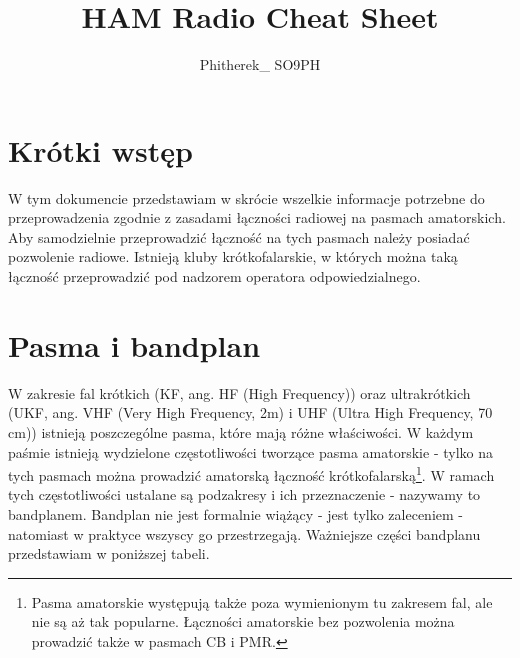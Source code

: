 \documentclass[a4paper,11pt]{article}
\author{Phitherek\_ SO9PH}
\title{HAM Radio Cheat Sheet}
\begin{document}
\maketitle
\tableofcontents
\section{Krótki wstęp}
W tym dokumencie przedstawiam w skrócie wszelkie informacje potrzebne do przeprowadzenia zgodnie z zasadami łączności radiowej na pasmach amatorskich. Aby samodzielnie przeprowadzić łączność na tych pasmach należy posiadać pozwolenie radiowe. Istnieją kluby krótkofalarskie, w których można taką łączność przeprowadzić pod nadzorem operatora odpowiedzialnego.
\section{Pasma i bandplan}
W zakresie fal krótkich (KF, ang. HF (High Frequency)) oraz ultrakrótkich (UKF, ang. VHF (Very High Frequency, 2m) i UHF (Ultra High Frequency, 70 cm)) istnieją poszczególne pasma, które mają różne właściwości. W każdym paśmie istnieją wydzielone częstotliwości tworzące pasma amatorskie - tylko na tych pasmach można prowadzić amatorską łączność krótkofalarską\footnote{Pasma amatorskie występują także poza wymienionym tu zakresem fal, ale nie są aż tak popularne. Łączności amatorskie bez pozwolenia można prowadzić także w pasmach CB i PMR.}. W ramach tych częstotliwości ustalane są podzakresy i ich przeznaczenie - nazywamy to bandplanem. Bandplan nie jest formalnie wiążący - jest tylko zaleceniem - natomiast w praktyce wszyscy go przestrzegają. Ważniejsze części bandplanu przedstawiam w poniższej tabeli.
\end{document}

